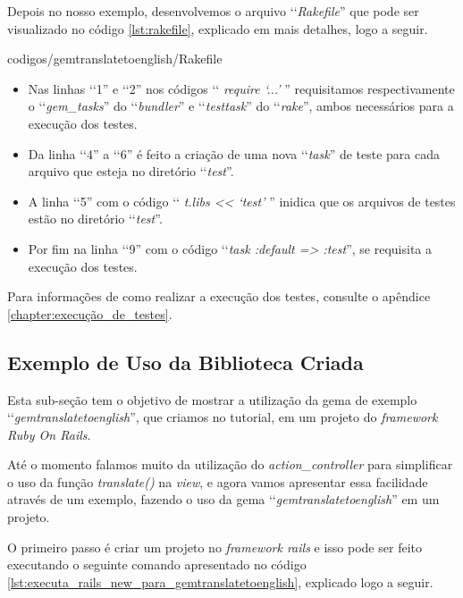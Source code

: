 Depois no nosso exemplo, desenvolvemos o arquivo ‘‘\emph{Rakefile}'' que pode ser visualizado no código
\ref{lst:rakefile}, explicado em mais detalhes, logo a seguir.


{codigos/gemtranslatetoenglish/Rakefile}

\begin{itemize}

\item Nas linhas ‘‘1'' e ‘‘2'' nos códigos ‘‘ \emph{require ‘...'} '' requisitamos respectivamente o
 ‘‘\emph{gem\_tasks}'' do ‘‘\emph{bundler}'' e ‘‘\emph{testtask}'' do ‘‘\emph{rake}'', ambos necessários para
 a execução dos testes.

 \item Da linha ‘‘4'' a ‘‘6'' é feito a criação de uma nova ‘‘\emph{task}'' de teste para cada arquivo
 que esteja no diretório ‘‘\emph{test}''.

 \item A linha ‘‘5'' com o código ‘‘ \emph{t.libs << ‘test'} '' inidica que os arquivos de testes estão no
 diretório ‘‘\emph{test}''.

 \item Por fim na linha ‘‘9'' com o código ‘‘\emph{task :default => :test}'', se requisita a execução
 dos testes.

\end{itemize}

Para informações de como realizar a execução dos testes, consulte o apêndice
\ref{chapter:execução_de_testes}.


\subsection{Exemplo de Uso da Biblioteca Criada}
\label{subsection:exemplo_de_uso_da_biblioteca_criada}


Esta sub-seção tem o objetivo de mostrar a utilização da gema de exemplo ‘‘\emph{gemtranslatetoenglish}'',
que criamos no tutorial, em um projeto do \emph{framework Ruby On Rails}.

Até o momento falamos muito da utilização do \emph{action\_controller} para simplificar o uso da função
\emph{translate()} na \emph{view}, e agora vamos apresentar essa facilidade através de um exemplo,
fazendo o uso da gema ‘‘\emph{gemtranslatetoenglish}'' em um projeto.

O primeiro passo é criar um projeto no \emph{framework rails} e isso pode ser feito executando
o seguinte comando apresentado no código \ref{lst:executa_rails_new_para_gemtranslatetoenglish},
explicado logo a seguir.

